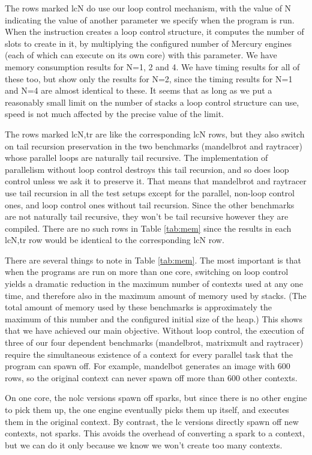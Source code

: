 The rows marked lcN do use our loop control mechanism,
with the value of N indicating
the value of another parameter we specify when the program is run.
When the  instruction
creates a loop control structure,
it computes the number of slots to create in it,
by multiplying the configured number of Mercury engines
(each of which can execute on its own core)
with this parameter.
We have memory consumption results for N=1, 2 and 4.
We have timing results for all of these too,
but show only the results for N=2,
since the timing results for N=1 and N=4 are almost identical to these.
It seems that as long as we put a reasonably small limit
on the number of stacks a loop control structure can use,
speed is not much affected by the precise value of the limit.

The rows marked lcN,tr are like the corresponding lcN rows,
but they also switch on tail recursion preservation
in the two benchmarks (mandelbrot and raytracer)
whose parallel loops are naturally tail recursive.
The implementation of parallelism without loop control
destroys this tail recursion,
and so does loop control unless we ask it to preserve it.
That means that mandelbrot and raytracer use tail recursion
in all the test setups except for
the parallel, non-loop control ones,
and loop control ones without tail recursion.
Since the other benchmarks are not naturally tail recursive,
they won't be tail recursive however they are compiled.
There are no such rows in Table \ref{tab:mem}
since the results in each lcN,tr row
would be identical to the corresponding lcN row.

There are several things to note in Table \ref{tab:mem}.
The most important is that when the programs are run on more than one core,
switching on loop control yields a dramatic reduction
in the maximum number of contexts used at any one time,
and therefore also in the maximum amount of memory used by stacks.
(The total amount of memory used by these benchmarks
is approximately the maximum of this number
and the configured initial size of the heap.)
This shows that we have achieved our main objective.
Without loop control, the execution of
three of our four dependent benchmarks (mandelbrot, matrixmult and raytracer)
require the simultaneous existence of a context
for every parallel task that the program can spawn off.
For example, mandelbot generates an image with 600 rows,
so the original context can never spawn off more than 600 other contexts.

On one core, the nolc versions spawn off sparks,
but since there is no other engine to pick them up,
the one engine eventually picks them up itself,
and executes them in the original context.
By contrast, the lc versions directly spawn off new contexts, not sparks.
This avoids the overhead of converting a spark to a context,
but we can do it only because we know we won't create too many contexts.


